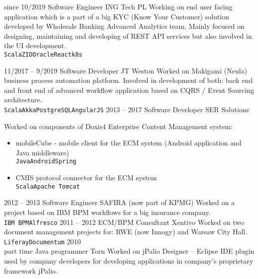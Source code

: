 \documentclass[8pt]{developercv} %
\begin{document}
\begin{entrylist}
	\entry
		{since 10/2019}
		{Software Engineer}
		{ING Tech PL}
		{Working on end user facing application which is a part of a big KYC (Know Your Customer) solution developed by Wholesale Banking Advanced Analytics team. Mainly focused on designing, maintaining and developing of REST API services but also involved in the UI development.\\
		\texttt{Scala}\slashsep\texttt{ZIO}\slashsep\texttt{Oracle}\slashsep\texttt{React}\slashsep\texttt{k8s}}

	\entry
		{11/2017 -- 9/2019}
		{Software Developer}
		{JT Weston}
		{Worked on Makigami (Neula) business process automation platform. Involved in development of both: back end and front end of advanced workflow application based on CQRS / Event Sourcing architecture.\\
		\texttt{Scala}\slashsep\texttt{Akka}\slashsep\texttt{PostgreSQL}\slashsep\texttt{AngularJS}}
	\entry
		{2013 -- 2017}
		{Software Developer}
		{SER Solutions}
		{Worked on components of Doxis4 Enterprise Content Management system:
		\begin{itemize}
			\item mobileCube - mobile client for the ECM system (Android application and Java middleware) \\ \texttt{Java}\slashsep\texttt{Android}\slashsep\texttt{Spring}
			\item CMIS protocol connector for the ECM system \\ \texttt{Scala}\slashsep\texttt{Apache Tomcat}
		\end{itemize}}
	\entry
		{2012 -- 2013}
		{Software Engineer}
		{SAFIRA (now part of KPMG)}
		{Worked on a project based on IBM BPM workflows for a big insurance company. \\ \texttt{IBM BPM}\slashsep\texttt{Alfresco}}
	\entry
		{2011 -- 2012}
		{ECM/BPM Consultant}
		{Xentivo}
		{Worked on two document management projects for: RWE (now Innogy) and Warsaw City Hall. \\ \texttt{Liferay}\slashsep\texttt{Documentum}}
	\entry
		{2010 \\\footnotesize{part time}}
		{Java programmer}
		{Torn}
		{Worked on jPalio Designer -- Eclipse IDE plugin used by company developers for developing applications in company's proprietary framework jPalio.}
			
\end{entrylist}

\end{document}
